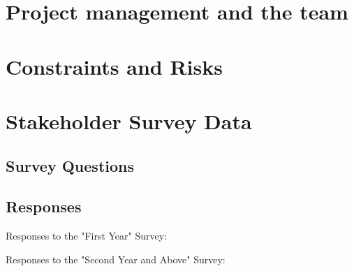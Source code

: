 \documentclass[manuscript]{acmart}
\begin{document}
\newpage

\section{Project management and the team}

\label{sec:project-management}


\newpage
\section{Constraints and Risks}


\newpage




\newpage
\appendix
\section{Stakeholder Survey Data}
\subsection{Survey Questions}


\subsection{Responses}
Responses to the "First Year" Survey:

Responses to the "Second Year and Above" Survey:
\end{document}
